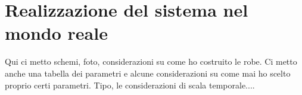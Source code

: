 \iffalse
\section{Realizzazione del sistema nel mondo reale}
\label{sec:sistema-reale}
Qui ci metto schemi, foto, considerazioni su come ho costruito le robe. Ci metto anche una tabella dei parametri e alcune considerazioni su come mai ho scelto proprio certi parametri. Tipo, le considerazioni di scala temporale....

